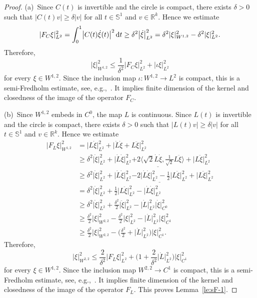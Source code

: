 \documentclass[pdftex]{sigma}
\numberwithin{equation}{section}
\newcommand{\R}{{\mathbb{R}}}
\renewcommand{\SS}{{\mathbb{S}}}
\def\abs#1{\mathopen|#1\mathclose|}
\newcommand{\1}{{{\mathchoice {\rm 1\mskip-4mu l} {\rm 1\mskip-4mu l}
{\rm 1\mskip-4.5mu l} {\rm 1\mskip-5mu l}}}}
\begin{document}
\begin{proof}
(a)~Since $C(t)$ is invertible and the circle is compact, there exists
$\delta>0$ such that $\abs{C(t)v}\ge \delta \abs{v}$
for all $t\in\SS^1$ and $v\in\R^k$.
Hence we estimate
\begin{equation*}
\begin{split}
 \abs{F_C\xi}_{L^2}^2
 =\int_0^1\bigl|C(t)\dot\xi(t)\bigr|^2\, {\rm d}t
 \ge\delta^2 \bigl|\dot\xi\bigr|_{L^2}^2
 =\delta^2 \abs{\xi}_{W^{1,2}}^2-\delta^2\abs{\xi}_{L^2}^2 .
\end{split}
\end{equation*}
Therefore,
\[
 \abs{\xi}_{W^{1,2}}^2
 \le\frac{1}{\delta^2}\abs{F_C\xi}_{L^2}^2+\abs{\iota \xi}_{L^2}^2
\]
for every $\xi\in W^{1,2}$.
Since the inclusion map $\iota\colon W^{1,2}\to L^2$ is compact,
this is a semi-Fredholm estimate, see, e.g.,~\cite[Lemma~A.1.1]{mcduff:2004a}.
It implies finite dimension of the kernel and closedness of the image
of the operator $F_C$.


(b)~Since $W^{1,2}$ embeds in $C^0$, the map $L$ is continuous.
Since $L(t)$ is invertible and the circle is compact, there exists
$\delta>0$ such that $\abs{L(t)v}\ge \delta \abs{v}$
for all $t\in\SS^1$ and $v\in\R^k$.
Hence we estimate
\begin{equation*}
\begin{split}
 \abs{F_L\xi}_{W^{1,2}}^2
 &=\bigl|L\dot\xi\bigr|_{L^2}^2+\bigl|\dot L\dot\xi+L\ddot\xi\bigr|_{L^2}^2
\\
 &\ge\delta^2 \bigl|\dot\xi\bigr|_{L^2}^2
 +\bigl|\dot L\dot\xi\bigr|_{L^2}^2
 \underline{+2\biggl\langle\!{\sqrt{2}\dot L\dot\xi},{\frac{1}{\sqrt{2}}L\ddot\xi}\biggr\rangle}
 +\bigl|L\ddot\xi\bigr|_{L^2}^2
\\
 &\ge\delta^2 \bigl|\dot\xi\bigr|_{L^2}^2
 +\bigl|\dot L\dot\xi\bigr|_{L^2}^2
 \underline{-2\bigl|\dot L\dot\xi\bigr|_{L^2}^2-\frac12\bigl|L\ddot\xi\bigr|_{L^2}^2}
 +\bigl|L\ddot\xi\bigr|_{L^2}^2
\\
 &=\delta^2 \bigl|\dot\xi\bigr|_{L^2}^2
 +\frac12 \bigl|L\ddot\xi\bigr|_{L^2}^2
 -\bigl|\dot L\dot\xi\bigr|_{L^2}^2
\\
 &\ge \delta^2 \bigl|\dot\xi\bigr|_{L^2}^2
 +\frac{\delta^2}{2}\bigl|\ddot\xi\bigr|_{L^2}^2
 -\bigl|\dot L\bigr|_{L^2}^2 \bigl|\dot\xi\bigr|_{C^0}^2
\\
 &\ge \frac{\delta^2}{2}\abs{\xi}_{W^{2,2}}^2
 -\frac{\delta^2}{2}\abs{\xi}_{L^2}^2
 -\abs{\dot L}_{L^2}^2 \abs{\xi}_{C^1}^2
\\
 &\ge \frac{\delta^2}{2}\abs{\xi}_{W^{2,2}}^2
 -\biggl(\frac{\delta^2}{2}+\abs{\dot L}_{L^2}^2 \biggr) \abs{\xi}_{C^1}^2.
\end{split}
\end{equation*}
Therefore,
\[
 \abs{\xi}_{W^{2,2}}^2
 \le\frac{2}{\delta^2}\abs{F_L\xi}_{L^2}^2
 +\biggl(1+\frac{2}{\delta^2}\abs{\dot L}_{L^2}^2\biggr)
 \abs{\xi}_{C^1}^2
\]
for every $\xi\in W^{1,2}$.
Since the inclusion map $W^{2,2}\to C^1$ is compact,
this is a semi-Fredholm estimate, see, e.g.,~\cite[Lemma~A.1.1]{mcduff:2004a}.
It implies finite dimension of the kernel and closedness of the image
of the operator $F_L$.
This proves Lemma~\ref{le:sF-1}.
\end{proof}
\end{document}
